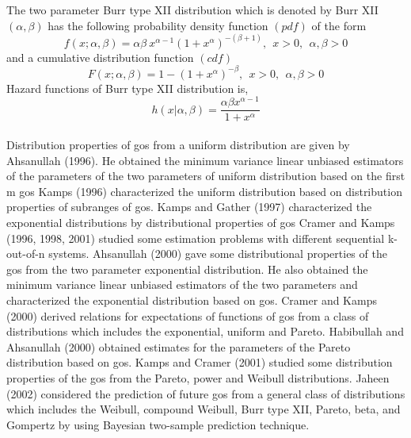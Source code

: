\documentclass[a4paper, 11pt]{article}
\numberwithin{equation}{section}
\begin{document}
The two parameter Burr type XII distribution which is denoted by Burr XII $(\alpha, \beta)$ has the following probability density function $(pdf)$ of the form
\begin{equation}
f(x; \alpha, \beta)=\alpha \beta ~x^{\alpha-1}(1+x^{\alpha})^{-(\beta+1)},~~x>0,~~\alpha, \beta>0
\label{eq:ge1}
\end{equation}
and a cumulative distribution function $(cdf)$
\begin{equation} 
F(x; \alpha, \beta)=1-(1+x^{\alpha})^{-\beta},~~x>0,~~\alpha, \beta>0
\label{eq:ge2}
\end{equation}
%
Hazard functions of Burr type XII distribution is,
\begin{equation}
h(x|\alpha,\beta)=\frac{\alpha\beta x^{\alpha-1}}{1+x^{\alpha}}
\end{equation}
\\
 Distribution properties of gos from a uniform distribution are given by Ahsanullah (1996). He obtained the minimum variance linear unbiased estimators of the parameters of the two parameters of uniform distribution based on the ﬁrst m gos Kamps (1996) characterized the uniform distribution based on distribution properties of subranges of gos. Kamps and Gather (1997) characterized the exponential distributions by distributional properties of gos Cramer and Kamps (1996, 1998, 2001) studied some estimation problems with different sequential k-out-of-n systems. Ahsanullah (2000) gave some distributional properties of the gos from the two parameter exponential distribution. He also obtained the minimum variance linear unbiased estimators of the two parameters and characterized the exponential distribution based on gos. Cramer and Kamps (2000) derived relations for expectations of functions of gos from a class of distributions which includes the exponential, uniform and Pareto. Habibullah and Ahsanullah (2000) obtained estimates for the parameters of the Pareto distribution based on gos. Kamps and Cramer (2001) studied some distribution properties of the gos from the Pareto, power and Weibull distributions. Jaheen (2002) considered the prediction of future gos from a general class of distributions which includes the Weibull, compound Weibull, Burr type XII, Pareto, beta, and Gompertz by using Bayesian  two-sample  prediction technique.
\end{document}
